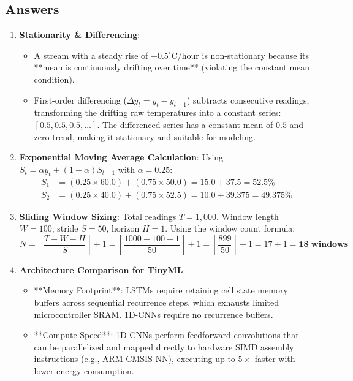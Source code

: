 \subsection*{Answers}

\begin{enumerate}
    \item \textbf{Stationarity \& Differencing}:
    \begin{itemize}
        \item A stream with a steady rise of $+0.5^\circ\text{C/hour}$ is non-stationary because its **mean is continuously drifting over time** (violating the constant mean condition).
        \item First-order differencing ($\Delta y_t = y_t - y_{t-1}$) subtracts consecutive readings, transforming the drifting raw temperatures into a constant series: $[0.5, 0.5, 0.5, \dots]$. The differenced series has a constant mean of $0.5$ and zero trend, making it stationary and suitable for modeling.
    \end{itemize}

    \item \textbf{Exponential Moving Average Calculation}:
    Using $S_t = \alpha y_t + (1 - \alpha) S_{t-1}$ with $\alpha = 0.25$:
    \begin{align*}
    S_1 &= (0.25 \times 60.0) + (0.75 \times 50.0) = 15.0 + 37.5 = \mathbf{52.5\%} \\
    S_2 &= (0.25 \times 40.0) + (0.75 \times 52.5) = 10.0 + 39.375 = \mathbf{49.375\%}
    \end{align*}

    \item \textbf{Sliding Window Sizing}:
    Total readings $T = 1{,}000$. Window length $W = 100$, stride $S = 50$, horizon $H = 1$.
    Using the window count formula:
    \begin{equation*}
    N = \left\lfloor \frac{T - W - H}{S} \right\rfloor + 1 = \left\lfloor \frac{1000 - 100 - 1}{50} \right\rfloor + 1 = \left\lfloor \frac{899}{50} \right\rfloor + 1 = 17 + 1 = \mathbf{18 \text{ windows}}
    \end{equation*}

    \item \textbf{Architecture Comparison for TinyML}:
    \begin{itemize}
        \item **Memory Footprint**: LSTMs require retaining cell state memory buffers across sequential recurrence steps, which exhausts limited microcontroller SRAM. 1D-CNNs require no recurrence buffers.
        \item **Compute Speed**: 1D-CNNs perform feedforward convolutions that can be parallelized and mapped directly to hardware SIMD assembly instructions (e.g., ARM CMSIS-NN), executing up to $5\times$ faster with lower energy consumption.
    \end{itemize}


\end{enumerate}
